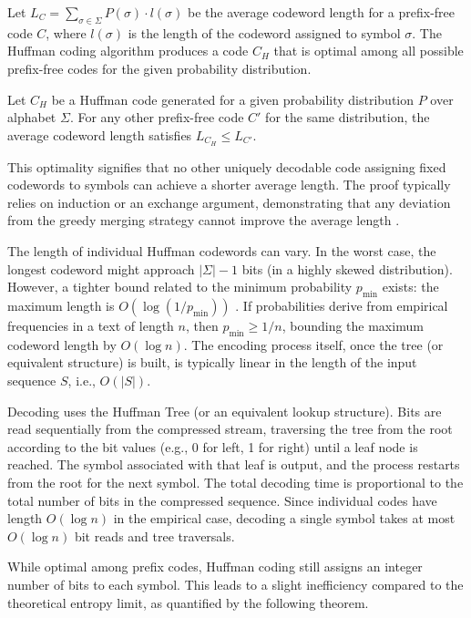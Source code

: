 Let $L_C = \sum_{\sigma \in \Sigma} P(\sigma) \cdot l(\sigma)$ be the average codeword length for a prefix-free code $C$, where $l(\sigma)$ is the length of the codeword assigned to symbol $\sigma$. The Huffman coding algorithm produces a code $C_H$ that is optimal among all possible prefix-free codes for the given probability distribution.

\begin{theorem} \label{thm:huffman_optimality}
    Let $C_H$ be a Huffman code generated for a given probability distribution $P$ over alphabet $\Sigma$. For any other prefix-free code $C'$ for the same distribution, the average codeword length satisfies $L_{C_H} \leq L_{C'}$.
\end{theorem}

This optimality signifies that no other uniquely decodable code assigning fixed codewords to symbols can achieve a shorter average length. The proof typically relies on induction or an exchange argument, demonstrating that any deviation from the greedy merging strategy cannot improve the average length \cite{ferragina2023pearls, sayood2002lossless, han2002mathematics, ElementsofInformationTheory}.

The length of individual Huffman codewords can vary. In the worst case, the longest codeword might approach $|\Sigma|-1$ bits (in a highly skewed distribution). However, a tighter bound related to the minimum probability $p_{\min}$ exists: the maximum length is $O(\log(1/p_{\min}))$ \cite{navarro2016compact}. If probabilities derive from empirical frequencies in a text of length $n$, then $p_{\min} \ge 1/n$, bounding the maximum codeword length by $O(\log n)$. The encoding process itself, once the tree (or equivalent structure) is built, is typically linear in the length of the input sequence $S$, i.e., $O(|S|)$.

Decoding uses the Huffman Tree (or an equivalent lookup structure). Bits are read sequentially from the compressed stream, traversing the tree from the root according to the bit values (e.g., 0 for left, 1 for right) until a leaf node is reached. The symbol associated with that leaf is output, and the process restarts from the root for the next symbol. The total decoding time is proportional to the total number of bits in the compressed sequence. Since individual codes have length $O(\log n)$ in the empirical case, decoding a single symbol takes at most $O(\log n)$ bit reads and tree traversals.

While optimal among prefix codes, Huffman coding still assigns an integer number of bits to each symbol. This leads to a slight inefficiency compared to the theoretical entropy limit, as quantified by the following theorem.

